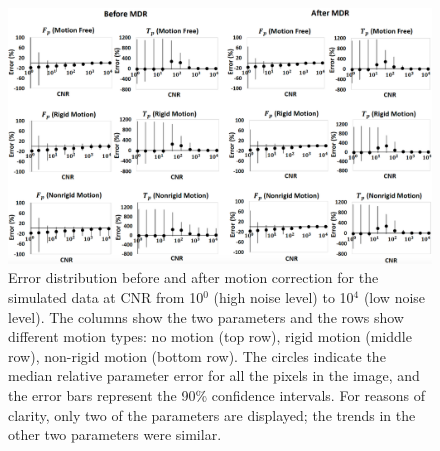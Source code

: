 \documentclass[num-refs]{wiley-article}
\begin{document}
\begin{figure}[tb!]
	\begin{center}
		\includegraphics[width=\textwidth]{Figures/8.eps}
		\caption{ Error distribution before and after motion correction for the simulated data at CNR from 10$^0$ (high noise level) to 10$^4$ (low noise level). The columns show the two parameters and the rows show different motion types: no motion (top row), rigid motion (middle row), non-rigid motion (bottom row). The circles indicate the median relative parameter error for all the pixels in the image, and the error bars represent the 90\%  confidence intervals. For reasons of clarity, only two of the parameters are displayed; the trends in the other two parameters were similar.}
	\end{center}
\end{figure}
\end{document}
